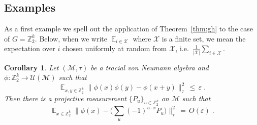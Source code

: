 \documentclass[11pt]{article}
\newtheorem{corollary}[theorem]{Corollary}
\theoremstyle{definition}
\DeclareMathOperator*{\Expectation}{\mathbb{E}}
\newcommand{\Es}[1]{\Expectation_{#1}}
\newcommand{\C}{\ensuremath{\mathbb{C}}}
\newcommand{\Z}{\ensuremath{\mathbb{Z}}}
\newcommand{\mM}{\ensuremath{\mathcal{M}}}
\newcommand{\mU}{\ensuremath{\mathcal{U}}}
\newcommand{\mX}{\ensuremath{\mathcal{X}}}
\newcommand{\eps}{\varepsilon}
\begin{document}
\begin{comment}
    &\leq \tau^\infty(w^*\phi_2^{-1}(y^{-1}x)(ww^*-P)\phi_2^{-1}(y)ww^*\phi_2(y)(ww^*-P)\phi_2(y^{-1}x)w)\notag\\
     &\leq \tau^\infty((ww^*-P)\phi_2^{-1}(y)ww^*\phi_2(y)(ww^*-P)\phi_2(y^{-1}x)ww^*\phi_2^{-1}(y^{-1}x))\notag\\
     &\leq \tau^\infty((ww^*-P)\phi_2^{-1}(y)ww^*\phi_2(y)(ww^*-P))\notag\\
     &\leq \tau^\infty(\underbrace{(ww^*-P)^2}_{P-ww^*}\phi_2^{-1}(y)ww^*\phi_2(y))\notag\\
     &\leq \frac{\eps}{1-\eps}\ \ ,\label{eq:lower_bound_stab_standard_pres1}
\end{align}
where we use the cyclicity of the trace, the fact $\mM$ is a corner and the evaluated operator is positive, the fact $\phi_2(y^{-1}x)ww^*\phi_2^{-1}(y^{-1}x)$ and $\phi_2^{-1}(y)ww^*\phi_2(y)$ are  contractions, as well as \eqref{eq:bound_on_P-ww*_in_trace_infty}.
Combining \eqref{eq:lower_bound_stab_standard_pres} and \eqref{eq:lower_bound_stab_standard_pres1}, we deduce that 
\begin{align*}
    \Vert \phi_1(x)-w^*\phi_2(x)w\Vert_\tau^2&=\Expectation_{y\in G}\Vert \phi_1(x)-w^*\phi_2(x)w\Vert_\tau^2\\
    &\leq 3\Expectation_{y\in G} [\Vert \phi_1(y^{-1}x)-w^*\phi_2(y^{-1}x)w\Vert_\tau^2+\Vert \phi_1(y)-w^*\phi_2(y)w\Vert_\tau^2\\
    &+\Vert w^*\phi_2(y)(ww^*-P)\phi_2(y^{-1}x)w\Vert_\tau^2 ]\\
    &\leq 3(\eps +\eps +\frac{\eps}{1-\eps})\leq 12\eps.
\end{align*}
\end{proof}
\end{comment}


\subsection{Examples}
\label{sec:examples}

As a first example we spell out the application of Theorem~\ref{thm:gh} to the case of $G=\Z_2^k$. 
Below, when we write $\Es{i\in \mX}$ where $\mX$ is a finite set, we mean the expectation over $i$ chosen uniformly at random from $\mX$, i.e.\ $\frac{1}{|\mX|} \sum_{i\in \mX}$. 

\begin{corollary}\label{cor:lin-test} %
Let $(\mM,\tau)$ be a tracial von Neumann algebra and $\phi:\Z_2^k \to \mU(\mM)$ such that 
\[ \Es{x,y\in \Z_2^k} \big\| \phi(x)\phi(y)-\phi(x+y) \big\|_{\tau}^2 \,\leq\,\eps\;.\]
Then there is a %
projective measurement $\{P_u\}_{u\in \Z_2^k}$ on $\mM$ such that 
\[ \Es{x\in \Z_2^k} \Big\| \phi(x) -\Big(\sum_u (-1)^{u\cdot x} P_u\Big)  \Big\|_{\tau}^2 \,=\, O(\eps)\;.\]
\end{corollary} 
\end{document}
